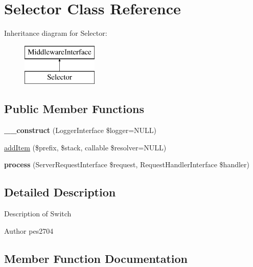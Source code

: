 \hypertarget{class_pes_1_1_middleware_1_1_selector}{}\section{Selector Class Reference}
\label{class_pes_1_1_middleware_1_1_selector}
Inheritance diagram for Selector\+:\begin{figure}[H]
\begin{center}
\leavevmode
\includegraphics[height=2.000000cm]{class_pes_1_1_middleware_1_1_selector}
\end{center}
\end{figure}
\subsection*{Public Member Functions}
\begin{DoxyCompactItemize}
\item 
\mbox{\label{class_pes_1_1_middleware_1_1_selector_a4d086b03f47931c183f0414bf2da5103}} 
{\bfseries \+\_\+\+\_\+construct} (Logger\+Interface \$logger=N\+U\+LL)
\item 
\mbox{\hyperlink{class_pes_1_1_middleware_1_1_selector_ac5aa307263a90cbc78be78bcb360f72a}{add\+Item}} (\$prefix, \$stack, callable \$resolver=N\+U\+LL)
\item 
\mbox{\label{class_pes_1_1_middleware_1_1_selector_ab7b53bcad05abdc42206f7b2ac87a88a}} 
{\bfseries process} (Server\+Request\+Interface \$request, Request\+Handler\+Interface \$handler)
\end{DoxyCompactItemize}


\subsection{Detailed Description}
Description of Switch

\begin{DoxyAuthor}{Author}
pes2704 
\end{DoxyAuthor}


\subsection{Member Function Documentation}
\mbox{\label{class_pes_1_1_middleware_1_1_selector_ac5aa307263a90cbc78be78bcb360f72a}} 
